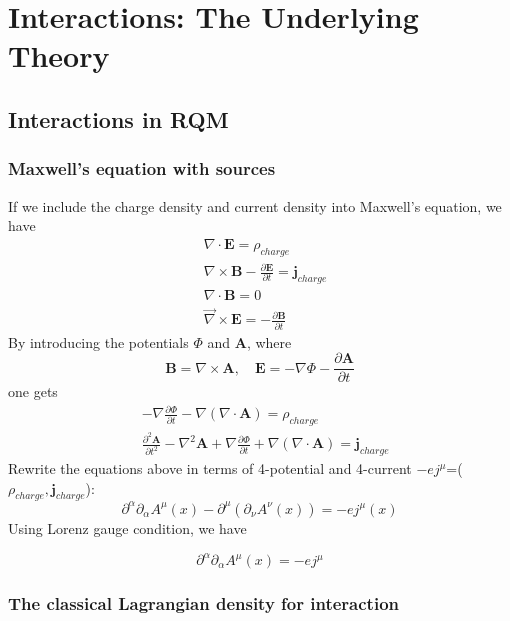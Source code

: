 \chapter{Interactions: The Underlying Theory}
\section{Interactions in RQM}
\subsection{Maxwell's equation with sources}
If we include the charge density and current density into Maxwell's equation, we have
\begin{equation}
\begin{aligned}
&\nabla \cdot \mathbf{E}=\rho_{charge}\\
&\nabla \times \mathbf{B}-\frac{\partial \mathbf{E}}{\partial t}=\mathbf{j}_{charge}\\
&\nabla \cdot \mathbf{B}=0\\
&\vec{\nabla} \times \mathbf{E}=-\frac{\partial \mathbf{B}}{\partial t}
\end{aligned}
\end{equation}
By introducing the potentials $\Phi$ and $\mathbf{A}$, where 
$$
\mathbf{B}=\nabla \times \mathbf{A}, \quad \mathbf{E}=-\nabla \Phi-\frac{\partial \mathbf{A}}{\partial t}
$$
one gets
\begin{equation}
\begin{aligned}
&-\nabla \frac{\partial \Phi}{\partial t}-\nabla(\nabla \cdot \mathbf{A})=\rho_{charge}\\
&\frac{\partial^{2} \mathbf{A}}{\partial t^{2}}-\nabla^{2} \mathbf{A}+\nabla \frac{\partial \Phi}{\partial t}+\nabla(\nabla\cdot\mathbf{A})=\mathbf{j}_{charge}
\end{aligned}
\end{equation}
Rewrite the equations above in terms of 4-potential and 4-current $-ej^{\mu}$=($\rho_{charge},\mathbf{j}_{charge}$):
\begin{equation}
    \partial^{\alpha}\partial_{\alpha}A^{\mu}(x)-\partial^{\mu}\left(\partial_{\nu}A^{\nu}(x)\right)=-ej^{\mu}(x)
\end{equation}
Using Lorenz gauge condition, we have
\begin{qt}
\begin{equation}
    \partial^{\alpha}\partial_{\alpha}A^{\mu}(x)=-ej^{\mu}
\end{equation}
\end{qt}
\subsection{The classical Lagrangian density for interaction}